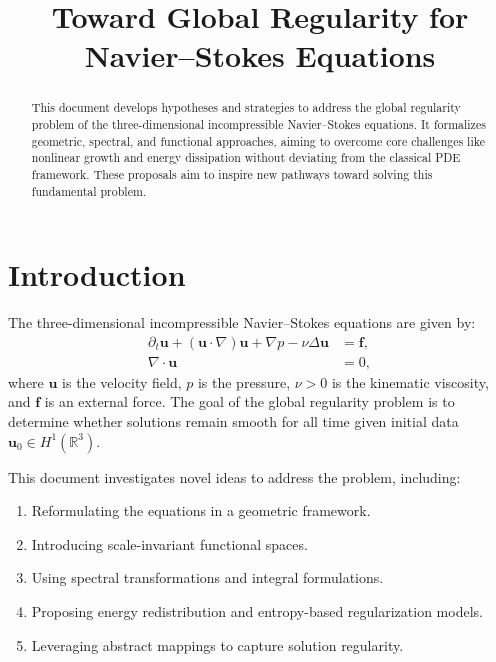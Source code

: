 \documentclass[12pt]{article}
\title{Toward Global Regularity for Navier--Stokes Equations}
\author{}
\date{}
\numberwithin{equation}{section}
\begin{document}
\maketitle

\begin{abstract}
This document develops hypotheses and strategies to address the global regularity problem of the three-dimensional incompressible Navier--Stokes equations. It formalizes geometric, spectral, and functional approaches, aiming to overcome core challenges like nonlinear growth and energy dissipation without deviating from the classical PDE framework. These proposals aim to inspire new pathways toward solving this fundamental problem.
\end{abstract}

\tableofcontents

\section{Introduction}
The three-dimensional incompressible Navier--Stokes equations are given by:
\begin{align}
    \partial_t \mathbf{u} + (\mathbf{u} \cdot \nabla)\mathbf{u} + \nabla p - \nu \Delta \mathbf{u} &= \mathbf{f}, \label{momentum} \\
    \nabla \cdot \mathbf{u} &= 0, \label{incompressibility}
\end{align}
where $\mathbf{u}$ is the velocity field, $p$ is the pressure, $\nu > 0$ is the kinematic viscosity, and $\mathbf{f}$ is an external force. The goal of the global regularity problem is to determine whether solutions remain smooth for all time given initial data $\mathbf{u}_0 \in H^1(\mathbb{R}^3)$.

This document investigates novel ideas to address the problem, including:
\begin{enumerate}[label=\textbf{\arabic*.}]
    \item Reformulating the equations in a geometric framework.
    \item Introducing scale-invariant functional spaces.
    \item Using spectral transformations and integral formulations.
    \item Proposing energy redistribution and entropy-based regularization models.
    \item Leveraging abstract mappings to capture solution regularity.
\end{enumerate}
\end{document}
